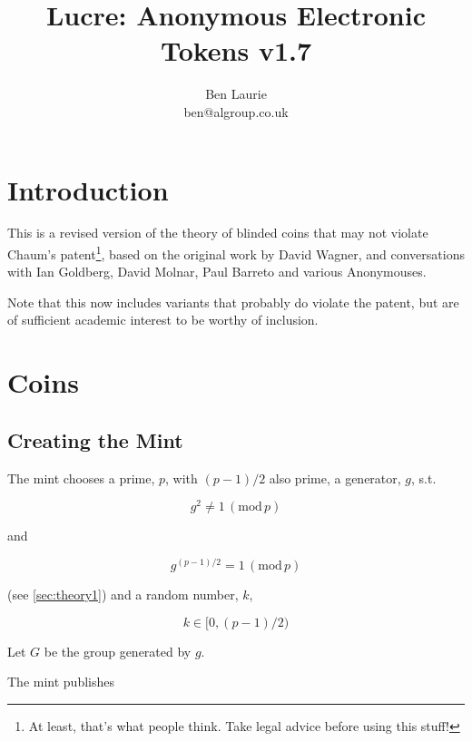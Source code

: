 \documentclass[a4paper,titlepage]{article}
\title{Lucre: Anonymous Electronic Tokens v1.7}
\author{Ben Laurie \\
ben@algroup.co.uk}
\begin{document}
\maketitle

\def\mod#1{\,(\textrm{mod}\,#1)}
\def\implies{\Rightarrow}
\def\qe#1{\begin{equation}#1\end{equation}}
\def\qearray#1{\begin{eqnarray}#1\end{eqnarray}}
\def\oneway#1{\textrm{oneway}(#1)}
\def\preoneway#1{\textrm{preoneway}(#1)}

\setlength{\parindent}{0pt}
\setlength{\parskip}{1ex plus 0.5ex minus 0.2ex}

\section{Introduction}

This is a revised version of the theory of blinded coins that may not
violate Chaum's patent\footnote{At least, that's what people
think. Take legal advice before using this stuff!}, based on the
original work by David Wagner, and conversations with Ian Goldberg,
David Molnar, Paul Barreto and various Anonymouses.

Note that this now includes variants that probably do violate the
patent, but are of sufficient academic interest to be worthy of
inclusion.

\section{Coins}

\subsection{Creating the Mint}
\label{sec:mint}

The mint chooses a prime, $p$, with $(p-1)/2$ also prime, a generator,
$g$, s.t.

\qe{\label{eq:3}g^2 \neq 1 \mod p}

and

\qe{\label{eq:1}g^{(p-1)/2} = 1 \mod p}

(see \ref{sec:theory1}) and a random number, $k$,

\qe{k \in [0,(p-1)/2)}

Let $G$ be the group generated by $g$.

The mint publishes
\end{document}
